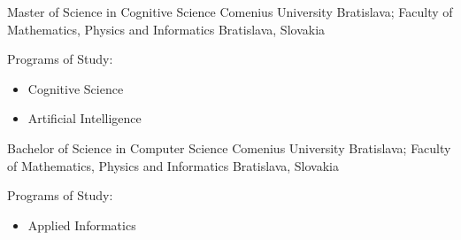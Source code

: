 

\begin{cventries}

  \cventry
    {Master of Science in Cognitive Science} %
    {Comenius University Bratislava; Faculty of Mathematics, Physics and Informatics} %
    {Bratislava, Slovakia} %
    {} %
    {
      \begin{cvitems} %
        \item[$$] {Programs of Study:}
        \begin{itemize}[leftmargin=3ex, label=\bullet]
          \item {Cognitive Science}
          \item {Artificial Intelligence}
        \end{itemize}
      \end{cvitems}
    }

  \cventry
    {Bachelor of Science in Computer Science} %
    {Comenius University Bratislava; Faculty of Mathematics, Physics and Informatics} %
    {Bratislava, Slovakia} %
    {} %
    {
      \begin{cvitems} %
        \item[$$] {Programs of Study:}
        \begin{itemize}[leftmargin=3ex, label=\bullet]
          \item {Applied Informatics}
        \end{itemize}
      \end{cvitems}
    }

\end{cventries}
